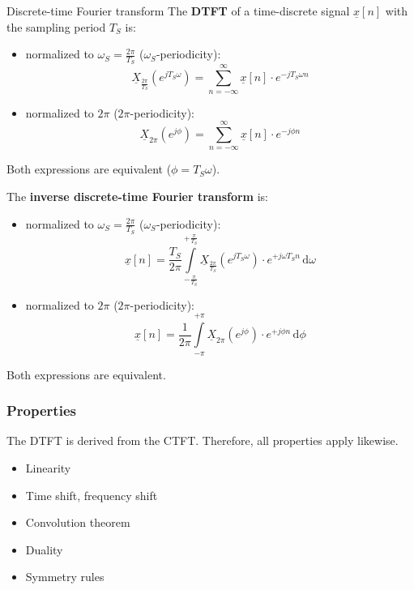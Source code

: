 \begin{refsection}
\begin{definition}{Discrete-time Fourier transform}
	The  \textbf{\acf{DTFT}} of a time-discrete signal $\underline{x}[n]$ with the sampling period $T_S$ is:
	\begin{itemize}
		\item normalized to $\omega_S = \frac{2\pi}{T_S}$ ($\omega_S$-periodicity):
		\begin{equation}
			\underline{X}_{\frac{2\pi}{T_S}} \left(e^{j T_S \omega}\right) = \sum\limits_{n = -\infty}^{\infty} \underline{x}[n] \cdot e^{-j T_S \omega n}
		\end{equation}
		\item normalized to $2 \pi$ ($2 \pi$-periodicity):
		\begin{equation}
			\underline{X}_{2 \pi} \left(e^{j \phi}\right) = \sum\limits_{n = -\infty}^{\infty} \underline{x}[n] \cdot e^{-j \phi n}
		\end{equation}
	\end{itemize}
	Both expressions are equivalent ($\phi = T_S \omega$).
	
	The  \textbf{inverse discrete-time Fourier transform} is:
	\begin{itemize}
		\item normalized to $\omega_S = \frac{2\pi}{T_S}$ ($\omega_S$-periodicity):
		\begin{equation}
			\underline{x}[n] = \frac{T_S}{2 \pi} \int\limits_{- \frac{\pi}{T_S}}^{+ \frac{\pi}{T_S}} \underline{X}_{\frac{2\pi}{T_S}}(e^{j T_S \omega}) \cdot e^{+ j \omega T_S n} \, \mathrm{d} \omega
		\end{equation}
		\item normalized to $2 \pi$ ($2 \pi$-periodicity):
		\begin{equation}
			\underline{x}[n] = \frac{1}{2 \pi} \int\limits_{- \pi}^{+ \pi} \underline{X}_{2\pi}(e^{j \phi}) \cdot e^{+ j \phi n} \, \mathrm{d} \phi
		\end{equation}
	\end{itemize}
	Both expressions are equivalent.
\end{definition}

\subsubsection{Properties}

The \ac{DTFT} is derived from the \ac{CTFT}. Therefore, all properties apply likewise.
\begin{itemize}
	\item Linearity
	\item Time shift, frequency shift
	\item Convolution theorem
	\item Duality
	\item Symmetry rules
\end{itemize}


\end{refsection}
